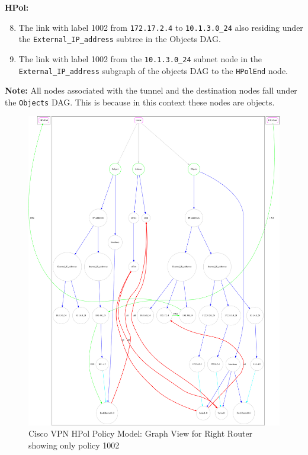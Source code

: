 \documentclass[12pt,letterpaper]{report}
\newcommand{\node}[1]{\texttt{#1}}
\newcommand{\tbf}[1]{\textbf{#1}}
\begin{document}
\begin{enumerate}
{		%
		{\tbf{HPol:}}
		\begin{enumerate}
			\setcounter{enumii}{7}
			\item {The link with label 1002 from \node{172.17.2.4} to \node{10.1.3.0\_24} also residing under the \node{External\_IP\_address} subtree in the Objects DAG.}
			
			\item {The link with label 1002 from the \node{10.1.3.0\_24} subnet node in the \node{External\_IP\_address} subgraph of the objects DAG to the \node{HPolEnd} node.}
			
		\end{enumerate}
		\tbf{Note:} All nodes associated with the tunnel and the destination nodes fall under the \texttt{Objects} DAG. This is because in this context these nodes are objects. 
	}%
\end{enumerate}

\begin{figure}
	\centering
	\includegraphics[angle=90, height=.9\textheight, width=\textwidth]{1002only.pdf}
	\caption[Cisco VPN HPol Policy Model (1002 only)]{Cisco VPN HPol Policy Model: Graph View for Right Router showing only policy 1002}
	\label{Figure:1002Only}
\end{figure}
\end{document}
